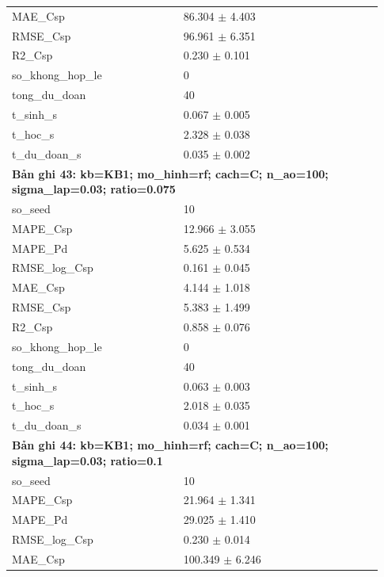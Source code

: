 \begin{longtable}{p{0.43\linewidth}p{0.50\linewidth}}
MAE\_\allowbreak Csp & 86.304 $\pm$ 4.403 \\
RMSE\_\allowbreak Csp & 96.961 $\pm$ 6.351 \\
R2\_\allowbreak Csp & 0.230 $\pm$ 0.101 \\
so\_\allowbreak khong\_\allowbreak hop\_\allowbreak le & 0 \\
tong\_\allowbreak du\_\allowbreak doan & 40 \\
t\_\allowbreak sinh\_\allowbreak s & 0.067 $\pm$ 0.005 \\
t\_\allowbreak hoc\_\allowbreak s & 2.328 $\pm$ 0.038 \\
t\_\allowbreak du\_\allowbreak doan\_\allowbreak s & 0.035 $\pm$ 0.002 \\
\midrule
\multicolumn{2}{p{0.95\linewidth}}{\textbf{Bản ghi 43: kb=KB1; mo\_hinh=rf; cach=C; n\_ao=100; sigma\_lap=0.03; ratio=0.075}} \\
so\_\allowbreak seed & 10 \\
MAPE\_\allowbreak Csp & 12.966 $\pm$ 3.055 \\
MAPE\_\allowbreak Pd & 5.625 $\pm$ 0.534 \\
RMSE\_\allowbreak log\_\allowbreak Csp & 0.161 $\pm$ 0.045 \\
MAE\_\allowbreak Csp & 4.144 $\pm$ 1.018 \\
RMSE\_\allowbreak Csp & 5.383 $\pm$ 1.499 \\
R2\_\allowbreak Csp & 0.858 $\pm$ 0.076 \\
so\_\allowbreak khong\_\allowbreak hop\_\allowbreak le & 0 \\
tong\_\allowbreak du\_\allowbreak doan & 40 \\
t\_\allowbreak sinh\_\allowbreak s & 0.063 $\pm$ 0.003 \\
t\_\allowbreak hoc\_\allowbreak s & 2.018 $\pm$ 0.035 \\
t\_\allowbreak du\_\allowbreak doan\_\allowbreak s & 0.034 $\pm$ 0.001 \\
\midrule
\multicolumn{2}{p{0.95\linewidth}}{\textbf{Bản ghi 44: kb=KB1; mo\_hinh=rf; cach=C; n\_ao=100; sigma\_lap=0.03; ratio=0.1}} \\
so\_\allowbreak seed & 10 \\
MAPE\_\allowbreak Csp & 21.964 $\pm$ 1.341 \\
MAPE\_\allowbreak Pd & 29.025 $\pm$ 1.410 \\
RMSE\_\allowbreak log\_\allowbreak Csp & 0.230 $\pm$ 0.014 \\
MAE\_\allowbreak Csp & 100.349 $\pm$ 6.246 \\

\end{longtable}
